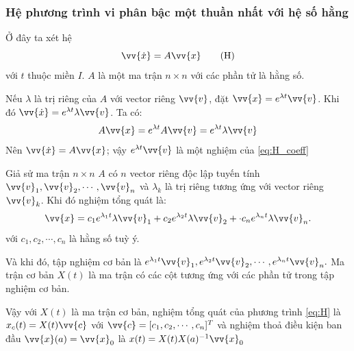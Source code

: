\documentclass[a4paper]{article}
\begin{document}
\subsubsection{Hệ phương trình vi phân bậc một thuần nhất với hệ số hằng}
Ở đây ta xét hệ 
\begin{equation}
    \vv{\dot{x}} = A\vv{x}   \tag{H}\label{eq:H_coeff}
\end{equation}
với $t$ thuộc miền $I$. $A$ là một ma trận $n \times n$ với các phần tử là hằng số. \par
Nếu $\lambda$ là trị riêng của $A$ với vector riêng $\vv{v}$, đặt $\vv{x} = e^{\lambda t}\vv{v}$. Khi đó $\vv{\dot{x}} = e^{\lambda t} \lambda \vv{v}$. Ta có:
\[
    A\vv{x} = e^{\lambda t}A\vv{v} = e^{\lambda t} \lambda \vv{v}
\]
Nên $\vv{\dot{x}} = A \vv{x}$; vậy $e^{\lambda t} \vv{v}$ là một nghiệm của \eqref{eq:H_coeff} \par
Giả sử  ma trận $n \times n$ $A$ có $n$ vector riêng độc lập tuyến tính $\vv{v}_1,\vv{v}_2,\cdots,\vv{v}_n$ và $\lambda_k$ là trị riêng tương ứng với vector riêng $\vv{v}_k$. Khi đó nghiệm tổng quát là:
\[
    \vv{x} = c_1 e^{\lambda_1 t} \lambda \vv{v}_1 + c_2 e^{\lambda_2 t} \lambda \vv{v}_2 + \cdot c_n e^{\lambda_n t} \lambda \vv{v}_n.
\]
với $c_1, c_2, \cdots, c_n$ là hằng số tuỳ ý. \par
Và khi đó, tập nghiệm cơ bản là $e^{\lambda_1t}\vv{v}_1, e^{\lambda_2t}\vv{v}_2,\cdots,e^{\lambda_nt}\vv{v}_n.$ Ma trận cơ bản $X(t)$ là ma trận có các cột tương ứng với các phần tử trong tập nghiệm cơ bản.\par
Vậy với $X(t)$ là ma trận cơ bản, nghiệm tổng quát của phương trình \eqref{eq:H} là $x_c(t) = X(t)\vv{c}$ với $\vv{c} = [c_1, c_2, \cdots, c_n]^T$ và nghiệm thoả điều kiện ban đầu $\vv{x}(a) = \vv{x}_0$ là 
$x(t) = X(t)X(a)^{-1}\vv{x}_0$
\end{document}
